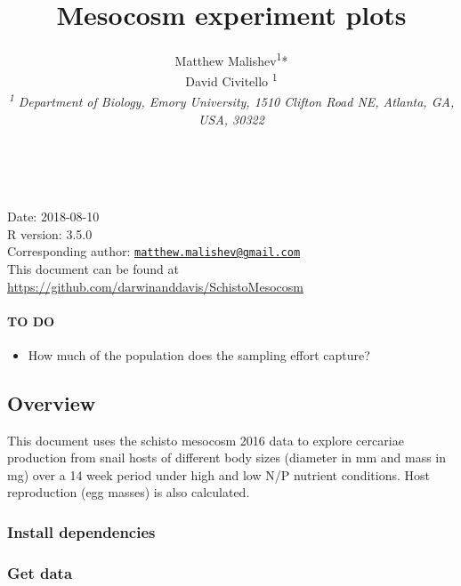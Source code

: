 \documentclass[10,portrait]{article}
\title{Mesocosm experiment plots}
\author{Matthew Malishev\textsuperscript{1}*\\
David Civitello \textsuperscript{1}\\
\emph{\textsuperscript{1} Department of Biology, Emory University, 1510
Clifton Road NE, Atlanta, GA, USA, 30322}}
\date{}
\newenvironment{Shaded}{\begin{snugshade}}{\end{snugshade}}
\newcommand{\KeywordTok}[1]{\textcolor[rgb]{0.13,0.29,0.53}{\textbf{#1}}}
\newcommand{\StringTok}[1]{\textcolor[rgb]{0.31,0.60,0.02}{#1}}
\newcommand{\CommentTok}[1]{\textcolor[rgb]{0.56,0.35,0.01}{\textit{#1}}}
\newcommand{\OperatorTok}[1]{\textcolor[rgb]{0.81,0.36,0.00}{\textbf{#1}}}
\newcommand{\NormalTok}[1]{#1}
\providecommand{\tightlist}{%
  \setlength{\itemsep}{0pt}\setlength{\parskip}{0pt}}
\let\oldparagraph\paragraph
\renewcommand{\paragraph}[1]{\oldparagraph{#1}\mbox{}}
\begin{document}
\maketitle

{
\hypersetup{linkcolor=black}
\setcounter{tocdepth}{3}
\tableofcontents
}
~

Date: 2018-08-10\\
R version: 3.5.0\\
Corresponding author:
\href{mailto:matthew.malishev@gmail.com}{\nolinkurl{matthew.malishev@gmail.com}}\\
This document can be found at
\url{https://github.com/darwinanddavis/SchistoMesocosm}

\newpage  

\paragraph{TO DO}\label{to-do}

\begin{itemize}
\tightlist
\item
  How much of the population does the sampling effort capture?
\end{itemize}

\subsection{Overview}\label{overview}

This document uses the schisto mesocosm 2016 data to explore cercariae
production from snail hosts of different body sizes (diameter in mm and
mass in mg) over a 14 week period under high and low N/P nutrient
conditions. Host reproduction (egg masses) is also calculated.

\subsubsection{Install dependencies}\label{install-dependencies}

\subsubsection{Get data}\label{get-data}

\begin{Shaded}
\end{Shaded}
\end{document}

